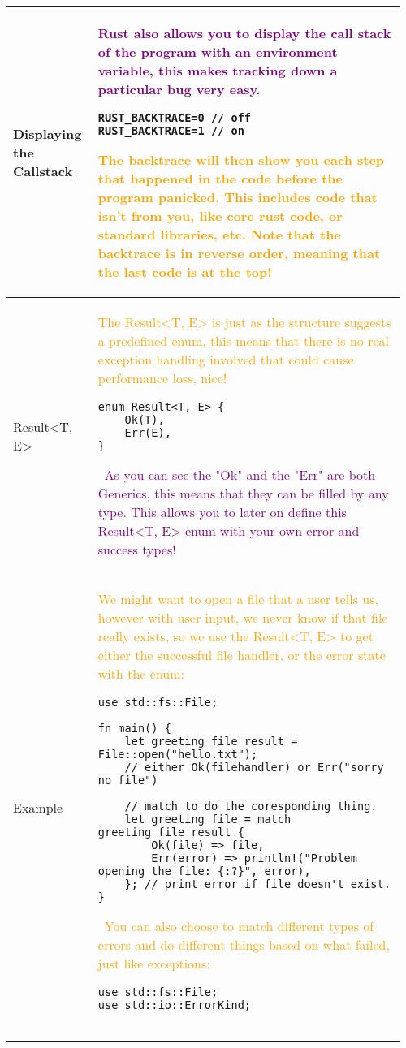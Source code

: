 \documentclass[main.tex,fontsize=8pt,paper=a4,paper=portrait,DIV=calc,]{scrartcl}
\begin{document}
\pagebreak
\begin{table}[ht!]
\begin{tabular}{|m{0.2\linewidth}|m{0.755\linewidth}|}
\hline
Displaying the Callstack & 
\textcolor{purple}{Rust also allows you to display the call stack of the program with an environment variable, this makes tracking down a particular bug very easy.}\newline
\begin{lstlisting}
RUST_BACKTRACE=0 // off
RUST_BACKTRACE=1 // on
\end{lstlisting}
\textcolor{orange}{The backtrace will then show you each step that happened in the code before the program panicked.\newline
This includes code that isn't from you, like core rust code, or standard libraries, etc.\newline
\textbf{Note that the backtrace is in reverse order, meaning that the last code is at the top!}}\\
\hline
Result<T, E> & 
\textcolor{orange}{The Result<T, E> is just as the structure suggests a predefined enum, this means that there is no real exception handling involved that could cause performance loss, nice!}\newline
\begin{lstlisting}
enum Result<T, E> {
    Ok(T),
    Err(E),
}
\end{lstlisting}
\, \newline
\textcolor{purple}{As you can see the "Ok" and the "Err" are both Generics, this means that they can be filled by any type.\newline
This allows you to later on define this Result<T, E> enum with your own error and success types!}\\
\hline
Example & 
\textcolor{orange}{We might want to open a file that a user tells us, however with user input, we never know if that file really exists, so we use the Result<T, E> to get either the successful file handler, or the error state with the enum:}\newline
\begin{lstlisting}
use std::fs::File;

fn main() {
    let greeting_file_result = File::open("hello.txt");
    // either Ok(filehandler) or Err("sorry no file")

    // match to do the coresponding thing.
    let greeting_file = match greeting_file_result {
        Ok(file) => file,
        Err(error) => println!("Problem opening the file: {:?}", error),
    }; // print error if file doesn't exist.
}
\end{lstlisting} 
\, \newline
\textcolor{orange}{You can also choose to match different types of errors and do different things based on what failed, just like exceptions:}\newline
\begin{lstlisting}
use std::fs::File;
use std::io::ErrorKind;


\end{lstlisting}
\end{tabular}
\end{table}
\end{document}
